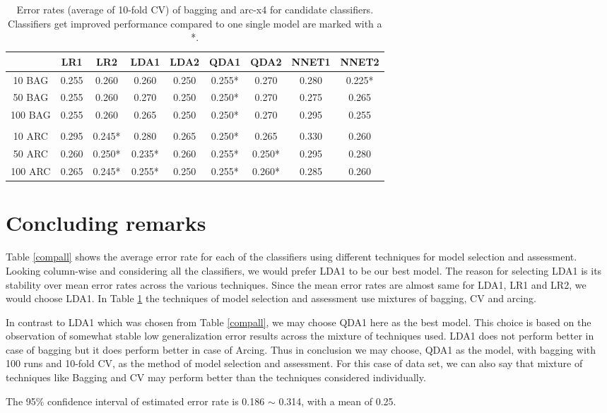 \documentclass[a4paper,12pt]{article}
\begin{document}
\begin{table}
\begin{center}
\caption[arc-nnet]{Error rates (average of 10-fold CV) of bagging and arc-x4 for candidate classifiers. Classifiers get improved performance compared to one single model are marked with a *.}
\label{perftab}
\begin{tabular}{ccccccccc}
\hline
        & LR1   & LR2   & LDA1  & LDA2  & QDA1  & QDA2  & NNET1 & NNET2 \\
\hline
10 BAG  & 0.255 & 0.260 & 0.260 & 0.250 & 0.255*& 0.270 & 0.280 & 0.225* \\
50 BAG  & 0.255 & 0.260 & 0.270 & 0.250 & 0.250*& 0.270 & 0.275 & 0.265 \\
100 BAG & 0.255 & 0.260 & 0.265 & 0.250 & 0.250*& 0.270 & 0.295 & 0.255 \\
&&&&&&&&\\
10 ARC  & 0.295 & 0.245*& 0.280 & 0.265 & 0.250*& 0.265 & 0.330 & 0.260 \\
50 ARC  & 0.260 & 0.250*& 0.235*& 0.260 & 0.255*& 0.250*& 0.295 & 0.280 \\
100 ARC & 0.265 & 0.245*& 0.255*& 0.250 & 0.255*& 0.260*& 0.285 & 0.260 \\
\hline
\end{tabular}
\end{center}
\end{table}


\section{Concluding remarks}

Table \ref{compall} shows the average error rate for each of the classifiers using different techniques for model selection and assessment. Looking column-wise and considering all the classifiers, we would prefer LDA1 to be our best model. The reason for selecting LDA1 is its stability over mean error rates across the various techniques. Since the mean error rates are almost same for LDA1, LR1 and LR2, we would choose LDA1. In Table \ref{perftab} the techniques of model selection and assessment use mixtures of bagging, CV and arcing. \par

In contrast to LDA1 which was chosen from Table \ref{compall}, we may choose QDA1 here as the best model. This choice is based on the observation of somewhat stable low generalization error results across the mixture of techniques used. LDA1 does not perform better in case of bagging but it does perform better in case of Arcing. Thus in conclusion we may choose, QDA1 as the model, with bagging with 100 runs and 10-fold CV, as the method of model selection and assessment. For this case of data set, we can also say that mixture of techniques like Bagging and CV may perform better than the techniques considered individually.

The 95\% confidence interval of estimated error rate is 0.186 $\sim$ 0.314, with a mean of 0.25.
\end{document}
